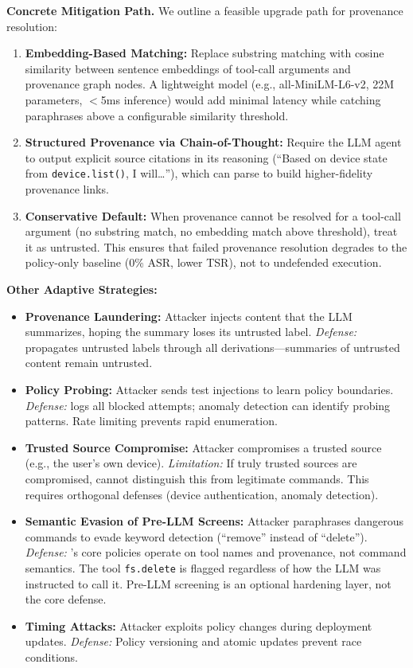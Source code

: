 \textbf{Concrete Mitigation Path.} We outline a feasible upgrade path for provenance resolution:
\begin{enumerate}[leftmargin=1.2em]
  \item \textbf{Embedding-Based Matching:} Replace substring matching with cosine similarity between sentence embeddings of tool-call arguments and provenance graph nodes. A lightweight model (e.g., all-MiniLM-L6-v2, 22M parameters, $<$5ms inference) would add minimal latency while catching paraphrases above a configurable similarity threshold.
  \item \textbf{Structured Provenance via Chain-of-Thought:} Require the LLM agent to output explicit source citations in its reasoning (``Based on device state from \texttt{device.list()}, I will\ldots''), which \sys{} can parse to build higher-fidelity provenance links.
  \item \textbf{Conservative Default:} When provenance cannot be resolved for a tool-call argument (no substring match, no embedding match above threshold), treat it as untrusted. This ensures that failed provenance resolution degrades to the policy-only baseline (0\% ASR, lower TSR), not to undefended execution.
\end{enumerate}

\textbf{Other Adaptive Strategies:}
\begin{itemize}[leftmargin=1.2em]
  \item \textbf{Provenance Laundering:} Attacker injects content that the LLM summarizes, hoping the summary loses its untrusted label. \emph{Defense:} \sys{} propagates untrusted labels through all derivations---summaries of untrusted content remain untrusted.
  
  \item \textbf{Policy Probing:} Attacker sends test injections to learn policy boundaries. \emph{Defense:} \sys{} logs all blocked attempts; anomaly detection can identify probing patterns. Rate limiting prevents rapid enumeration.
  
  \item \textbf{Trusted Source Compromise:} Attacker compromises a trusted source (e.g., the user's own device). \emph{Limitation:} If truly trusted sources are compromised, \sys{} cannot distinguish this from legitimate commands. This requires orthogonal defenses (device authentication, anomaly detection).
  
  \item \textbf{Semantic Evasion of Pre-LLM Screens:} Attacker paraphrases dangerous commands to evade keyword detection (``remove'' instead of ``delete''). \emph{Defense:} \sys{}'s core policies operate on tool names and provenance, not command semantics. The tool \texttt{fs.delete} is flagged regardless of how the LLM was instructed to call it. Pre-LLM screening is an optional hardening layer, not the core defense.
  
  \item \textbf{Timing Attacks:} Attacker exploits policy changes during deployment updates. \emph{Defense:} Policy versioning and atomic updates prevent race conditions.
\end{itemize}

